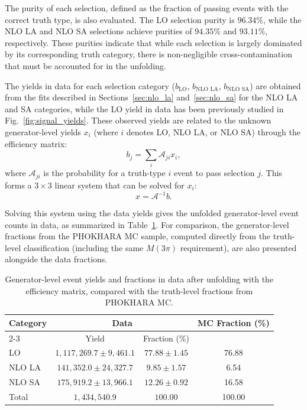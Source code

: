 The purity of each selection, defined as the fraction of passing events with the correct truth type, is also evaluated. The LO selection purity is $96.34\%$, while the NLO LA and NLO SA selections achieve purities of $94.35\%$ and $93.11\%$, respectively. These purities indicate that while each selection is largely dominated by its corresponding truth category, there is non-negligible cross-contamination that must be accounted for in the unfolding.

The yields in data for each selection category ($b_{\text{LO}}$, $b_{\text{NLO LA}}$, $b_{\text{NLO SA}}$) are obtained from the fits described in Sections~\ref{sec:nlo_la} and~\ref{sec:nlo_sa} for the NLO LA and SA categories, while the LO yield in data has been previously studied in Fig.~\ref{fig:signal_yields}. These observed yields are related to the unknown generator-level yields $x_i$ (where $i$ denotes LO, NLO LA, or NLO SA) through the efficiency matrix:
\[
    b_j = \sum_i \mathcal{A}_{ji} x_i,
\]
where $\mathcal{A}_{ji}$ is the probability for a truth-type $i$ event to pass selection $j$. This forms a $3 \times 3$ linear system that can be solved for $x_i$:
\[
    x = \mathcal{A}^{-1} b.
\]

Solving this system using the data yields gives the unfolded generator-level event counts in data, as summarized in Table~\ref{tab:yields_comparison}. For comparison, the generator-level fractions from the PHOKHARA MC sample, computed directly from the truth-level classification (including the same $M(3\pi)$ requirement), are also presented alongside the data fractions.

\begin{table}[htbp]
    \centering
    \caption{Generator-level event yields and fractions in data after unfolding with the efficiency matrix, compared with the truth-level fractions from PHOKHARA MC.}
    \vspace{4mm}
    \begin{tabular}{lccc}
        \hline
        \multirow{2}{*}{Category} & \multicolumn{2}{c}{Data} & \multirow{2}{*}{MC Fraction (\%)} \\
        \cline{2-3}
        & Yield & Fraction (\%) & \\
        \hline
        LO       & $1,117,269.7 \pm 9,461.1$ & $77.88 \pm 1.45$ & 76.88 \\
        NLO LA   & $141,352.0 \pm 24,327.7$ & $9.85 \pm 1.57$ & 6.54 \\
        NLO SA   & $175,919.2 \pm 13,966.1$ & $12.26 \pm 0.92$ & 16.58 \\
        \hline
        Total    & $1,434,540.9$ & $100.00$ & 100.00 \\
        \hline
    \end{tabular}
    \label{tab:yields_comparison}
\end{table}

